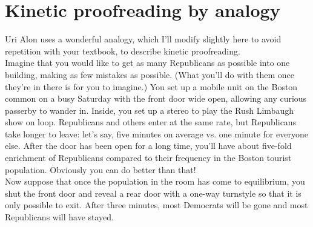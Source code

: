 \documentclass{article}
\begin{document}
\section*{Kinetic proofreading by analogy}

Uri Alon uses a wonderful analogy, which I'll modify slightly here to avoid repetition with your textbook, to describe kinetic proofreading.\\

Imagine that you would like to get as many Republicans as possible into one building, making as few mistakes as possible. (What you'll do with them once they're in there is for you to imagine.) You set up a mobile unit on the Boston common on a busy Saturday with the front door wide open, allowing any curious passerby to wander in. Inside, you set up a stereo to play the Rush Limbaugh show on loop. Republicans and others enter at the same rate, but Republicans take longer to leave: let's say, five minutes on average vs. one minute for everyone else. After the door has been open for a long time, you'll have about five-fold enrichment of Republicans compared to their frequency in the Boston tourist population. Obviously you can do better than that!\\

Now suppose that once the population in the room has come to equilibrium, you shut the front door and reveal a rear door with a one-way turnstyle so that it is only possible to exit. After three minutes, most Democrats will be gone and most Republicans will have stayed.
\end{document}
